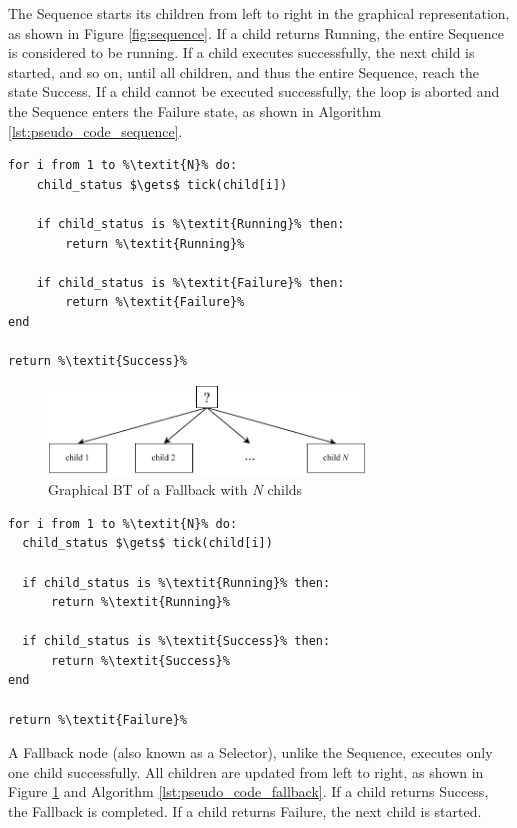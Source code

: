 The Sequence starts its children from left to right in the graphical representation, as shown in Figure \ref{fig:sequence}. If a child returns Running, the entire Sequence is considered to be running. If a child executes successfully, the next child is started, and so on, until all children, and thus the entire Sequence, reach the state Success. If a child cannot be executed successfully, the loop is aborted and the Sequence enters the Failure state, as shown in Algorithm \ref{lst:pseudo_code_sequence}.
  
\begin{lstlisting}[float=h]
for i from 1 to %\textit{N}% do:
    child_status $\gets$ tick(child[i])
    
    if child_status is %\textit{Running}% then:
        return %\textit{Running}%
        
    if child_status is %\textit{Failure}% then:
        return %\textit{Failure}%
end

return %\textit{Success}%
\end{lstlisting}
\begin{figure}[h]
    \centering \captionsetup{justification=centering}
    \includegraphics[width=0.75\textwidth]{figures/20_state_of_the_art/fallback.pdf}
    \caption{Graphical BT of a Fallback with \textit{N} childs}
    \label{fig:fallback}
\end{figure}
\begin{lstlisting}[float=h]
for i from 1 to %\textit{N}% do:
  child_status $\gets$ tick(child[i])
  
  if child_status is %\textit{Running}% then:
      return %\textit{Running}%
      
  if child_status is %\textit{Success}% then:
      return %\textit{Success}%
end

return %\textit{Failure}%
\end{lstlisting}
A Fallback node (also known as a Selector), unlike the Sequence, executes only one child successfully. All children are updated from left to right, as shown in Figure \ref{fig:fallback} and Algorithm \ref{lst:pseudo_code_fallback}. If a child returns Success, the Fallback is completed. If a child returns Failure, the next child is started.

